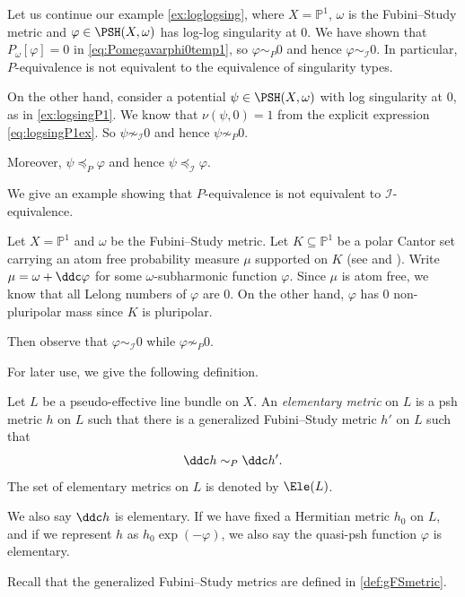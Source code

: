\begin{example}\label{ex:Pequivnotequivex}
    Let us continue our example \cref{ex:loglogsing}, where $X=\mathbb{P}^1$, $\omega$ is the Fubini--Study metric and $\varphi\in \PSH(X,\omega)$ has log-log singularity at $0$. We have shown that $P_{\omega}[\varphi]=0$ in \eqref{eq:Pomegavarphi0temp1}, so $\varphi\sim_{P} 0$ and hence $\varphi\sim_{\mathcal{I}} 0$. In particular, $P$-equivalence is not equivalent to the equivalence of singularity types.

    On the other hand, consider a potential $\psi\in \PSH(X,\omega)$ with log singularity at $0$, as in \cref{ex:logsingP1}. We know that $\nu(\psi,0)=1$ from the explicit expression \eqref{eq:logsingP1ex}. So $\psi\not\sim_{\mathcal{I}} 0$ and hence $\psi\not\sim_{P} 0$.

    Moreover, $\psi \preceq_{P} \varphi$ and hence $\psi\preceq_{\mathcal{I}}\varphi$.
\end{example}


We give an example showing that $P$-equivalence is not equivalent to $\mathcal{I}$-equivalence.
\begin{example}\label{ex:BBJ}
    Let $X=\mathbb{P}^1$ and $\omega$ be the Fubini--Study metric. Let $K\subseteq \mathbb{P}^1$ be a polar Cantor set carrying an atom free probability measure $\mu$ supported on $K$ (see \cite[Page~31]{Car83} and \cite[Proposition~4.2.4]{FPT}). Write $\mu=\omega+\ddc\varphi$ for some $\omega$-subharmonic function $\varphi$. Since $\mu$ is atom free, we know that all Lelong numbers of $\varphi$ are $0$. On the other hand, $\varphi$ has $0$ non-pluripolar mass since $K$ is pluripolar.

    Then observe that $\varphi\sim_{\mathcal{I}} 0$ while $\varphi\not\sim_P 0$.
\end{example}

For later use, we give the following definition.
\begin{definition}\label{def:elemetric}
    Let $L$ be a pseudo-effective line bundle on $X$. An \emph{elementary metric} on $L$ is a psh metric $h$ on $L$ such that there is a generalized Fubini--Study metric $h'$ on $L$ such that
    \[
    \ddc h\sim_{P} \ddc h'.
    \]
    The set of elementary metrics on $L$ is denoted by $\Ele(L)$.

    We also say $\ddc h$ is elementary. If we have fixed a Hermitian metric $h_0$ on $L$, and if we represent $h$ as $h_0\exp(-\varphi)$, we also say the quasi-psh function $\varphi$ is elementary.
\end{definition}
Recall that the generalized Fubini--Study metrics are defined in \cref{def:gFSmetric}.

